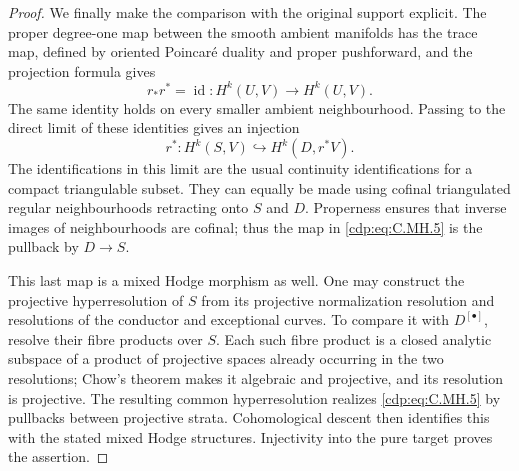\begin{proof}
We finally make the comparison with the original
support explicit. The proper degree-one map between
the smooth ambient manifolds has the trace map, defined
by oriented Poincar\'e duality and proper pushforward,
and the projection formula gives
\[
 r_*r^*=\operatorname{id}:H^k(U,V)\longrightarrow H^k(U,V).
 \tag{C.MH.4}\label{cdp:eq:C.MH.4}
\]
The same identity holds on every smaller ambient
neighbourhood. Passing to the direct limit of these
identities gives an injection
\[
                  r^*:H^k(S,V)\hookrightarrow H^k(D,r^*V).
 \tag{C.MH.5}\label{cdp:eq:C.MH.5}
\]
The identifications in this limit are the usual
continuity identifications for a compact triangulable
subset. They can equally be made using cofinal
triangulated regular neighbourhoods retracting onto
$S$ and $D$. Properness ensures that inverse images of
neighbourhoods are cofinal; thus the map in \eqref{cdp:eq:C.MH.5}
is the pullback by $D\to S$.

This last map is a mixed Hodge morphism as well. One
may construct the projective hyperresolution of $S$
from its projective normalization resolution and
resolutions of the conductor and exceptional curves.
To compare it with $D^{[\bullet]}$, resolve their
fibre products over $S$. Each such fibre product is a
closed analytic subspace of a product of projective
spaces already occurring in the two resolutions;
Chow's theorem makes it algebraic and projective,
and its resolution is projective. The resulting
common hyperresolution realizes \eqref{cdp:eq:C.MH.5} by pullbacks
between projective strata. Cohomological descent then
identifies this with the stated mixed Hodge structures.
Injectivity into the pure target proves the assertion.
\end{proof}


